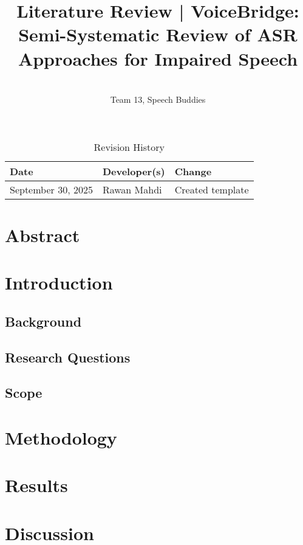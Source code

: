 \documentclass{article}
\title{Literature Review | VoiceBridge: \textbf{Semi-Systematic Review of ASR Approaches for Impaired Speech}}
\author{\\ Team 13, Speech Buddies}
\date{}
\begin{document}
\maketitle

\begin{table}[hp]
\caption{Revision History} \label{TblRevisionHistory}
\begin{tabularx}{\textwidth}{llX}
\toprule
\textbf{Date} & \textbf{Developer(s)} & \textbf{Change}\\
\midrule
September 30, 2025 & Rawan Mahdi & Created template\\ 
\bottomrule
\end{tabularx}
\end{table}

\newpage{}

\section*{Abstract}

\section{Introduction}
\subsection{Background}
\subsection{Research Questions}
\subsection{Scope}

\section{Methodology}

\section{Results}

\section{Discussion}
\end{document}
